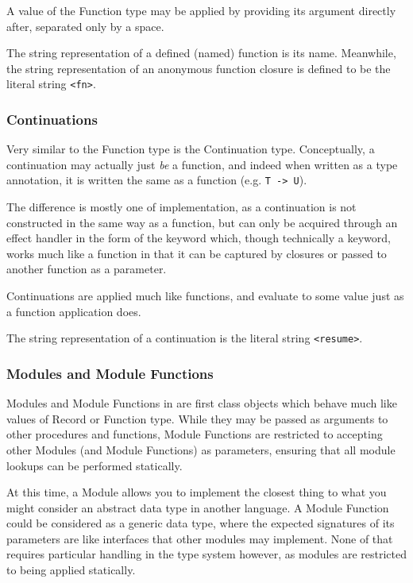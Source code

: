 A value of the Function type may be applied by providing its argument directly after,
separated only by a space.

The string representation of a defined (named) function is its name. Meanwhile, the
string representation of an anonymous function closure is defined to be the literal
string \texttt{<fn>}.

\subsubsection{Continuations}

Very similar to the Function type is the Continuation type. Conceptually, a continuation
may actually just \emph{be} a function, and indeed when written as a type annotation, it
is written the same as a function (e.g. \texttt{T -> U}).

The difference is mostly one of implementation, as a continuation is not constructed in
the same way as a function, but can only be acquired through an effect handler in the
form of the  keyword which, though technically a keyword, works much like a
function in that it can be captured by closures or passed to another function as a
parameter.

Continuations are applied much like functions, and evaluate to some value just as a
function application does.

The string representation of a continuation is the literal string \texttt{<resume>}.

\subsubsection{Modules and Module Functions}

Modules and Module Functions in \Trilogy{} are first class objects which behave much
like values of Record or Function type. While they may be passed as arguments
to other procedures and functions, Module Functions are restricted to accepting other
Modules (and Module Functions) as parameters, ensuring that all module lookups can be
performed statically.

At this time, a Module allows you to implement the closest thing to what you might
consider an abstract data type in another language. A Module Function could be considered
as a generic data type, where the expected signatures of its parameters are like interfaces that
other modules may implement. None of that requires particular handling in the type system
however, as modules are restricted to being applied statically.

